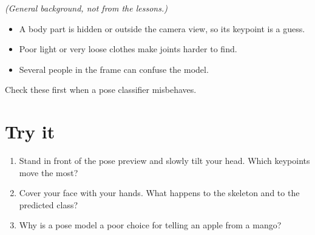 \emph{(General background, not from the lessons.)}


\begin{itemize}
\item A body part is hidden or outside the camera view, so its keypoint is a guess.
\item Poor light or very loose clothes make joints harder to find.
\item Several people in the frame can confuse the model.
\end{itemize}

Check these first when a pose classifier misbehaves.


\section{Try it}

\begin{enumerate}
\item Stand in front of the pose preview and slowly tilt your head. Which keypoints move the most?
\item Cover your face with your hands. What happens to the skeleton and to the predicted class?
\item Why is a pose model a poor choice for telling an apple from a mango?
\end{enumerate}
